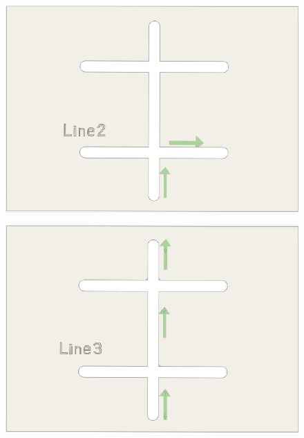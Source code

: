 \documentclass{beamer}
\begin{document}
\begin{frame}
	\begin{figure}[htpb]
		\centering
		\includegraphics[width=1\linewidth]{figure/line2.png}
	\end{figure}
\end{frame}

\begin{frame}
	\begin{figure}[htpb]
		\centering
		\includegraphics[width=1\linewidth]{figure/line3.png}
	\end{figure}
\end{frame}
\end{document}
